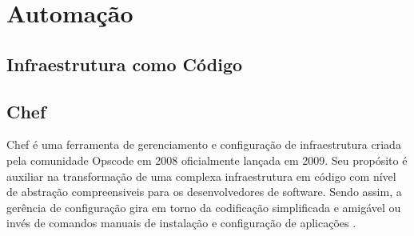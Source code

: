 \section{Automação}

\subsection{Infraestrutura como Código}
\label{sec:infra-code}

\subsection{Chef}
\label{sec:chef}

Chef é uma ferramenta de gerenciamento e configuração de infraestrutura criada
pela comunidade Opscode em 2008 oficialmente lançada em 2009. Seu propósito é
auxiliar na transformação de uma complexa infraestrutura em código com nível
de abstração compreensiveis para os desenvolvedores de software. Sendo assim,
a gerência de configuração gira em torno da codificação simplificada e amigável
ou invés de comandos manuais de instalação e configuração de aplicações
\cite{sharma:2015}.

